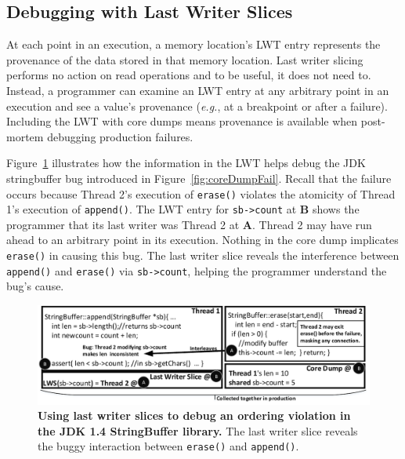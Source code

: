 \documentclass[preprint,9pt]{sigplanconf}
\newcommand{\lwt}{LWT\xspace}
\begin{document}
\subsection{Debugging with Last Writer Slices}
\label{sec:debugging}

At each point in an execution, a memory location's \lwt entry represents the
provenance of the data stored in that memory location.   Last writer slicing
performs no action on read operations and to be useful, it does not need to.
Instead, a programmer can examine an \lwt entry at any arbitrary point in an
execution and see a value's
provenance ({\em e.g.}, at a breakpoint or after a failure).  Including the \lwt with core dumps means provenance is available
when post-mortem debugging production failures.

Figure~\ref{fig:jdklws} illustrates how the information in the \lwt helps debug
the JDK stringbuffer bug introduced in Figure~\ref{fig:coreDumpFail}.  Recall
that the failure occurs because Thread 2's execution of {\tt erase()} violates
the atomicity of Thread 1's execution of {\tt append()}.  The \lwt entry for
{\tt sb->count} at {\bf B} shows the programmer that its last writer was Thread
2 at {\bf A}. Thread 2 may have run ahead to an arbitrary point in its
execution.  Nothing in the core dump implicates {\tt erase()} in causing
this bug.  The last writer slice reveals the interference between {\tt append()}
and {\tt erase()} via {\tt sb->count}, helping the programmer understand the
bug's cause.




\begin{figure}[h]
\centering
\includegraphics[width=\columnwidth]{figs/JDKStringBufferDebug2.pdf}
\caption{\label{fig:jdklws}{\bf Using last writer slices to debug an
ordering violation in the JDK 1.4 StringBuffer library.} The last writer slice reveals the buggy interaction between {\tt erase()} and {\tt append()}.}
\end{figure}
\end{document}
